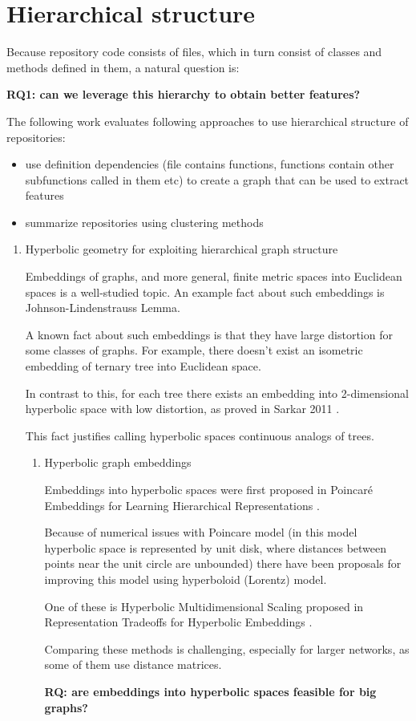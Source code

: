 \documentclass[longabstract,mgr,english]{iithesis}
\begin{document}
{\color{red}
\section{Hierarchical structure}

Because repository code consists of files, which in turn consist of classes and methods defined in them, a natural question is:

\textbf{\textbf{RQ1: can we leverage this hierarchy to obtain better features?}}

The following work evaluates following approaches to use hierarchical structure of repositories:

\begin{itemize}
\item use definition dependencies (file contains functions, functions contain other subfunctions called in them etc) to create a graph that can be used to extract features
\item summarize repositories using clustering methods
\end{itemize}


\begin{enumerate}
\item Hyperbolic geometry for exploiting hierarchical graph structure


Embeddings of graphs, and more general, finite metric spaces into Euclidean spaces is a well-studied topic.
An example fact about such embeddings is Johnson-Lindenstrauss Lemma.

A known fact about such embeddings is that they have large distortion for some classes of graphs. For example, there doesn't exist an isometric embedding of ternary tree into Euclidean space.

In contrast to this, for each tree there exists an embedding into 2-dimensional hyperbolic space with low distortion, as proved in Sarkar 2011 \cite{sarkar}.

This fact justifies calling hyperbolic spaces continuous analogs of trees.

\begin{enumerate}
\item Hyperbolic graph embeddings

     Embeddings into hyperbolic spaces were first proposed in Poincaré Embeddings for
Learning Hierarchical Representations \cite{poincare}.

Because of numerical issues with Poincare model (in this model hyperbolic space is represented by unit disk, where distances between points near the unit circle are unbounded) there have been proposals for improving this model using hyperboloid (Lorentz) model.

One of these is Hyperbolic Multidimensional Scaling proposed in Representation Tradeoffs for Hyperbolic Embeddings \cite{tradeoffs}.

Comparing these methods is challenging, especially for larger networks, as some of them use distance matrices.

\textbf{\textbf{RQ: are embeddings into hyperbolic spaces feasible for big graphs?}}
\end{enumerate}
\end{enumerate}
}
\end{document}
